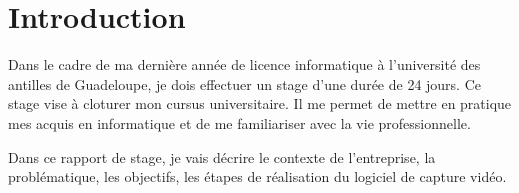 \chapter{Introduction}
\minitoc    
    Dans le cadre de ma dernière année de licence informatique à l'université des antilles de Guadeloupe, je dois effectuer un stage d'une durée de 24 jours. Ce stage vise à cloturer mon cursus universitaire.
    Il me permet de mettre en pratique mes acquis en informatique et de me familiariser avec la vie professionnelle.

    \vspace{0.5cm}

    Dans ce rapport de stage, je vais décrire le contexte de l'entreprise, la problématique, les objectifs, les étapes de réalisation du logiciel de capture vidéo.